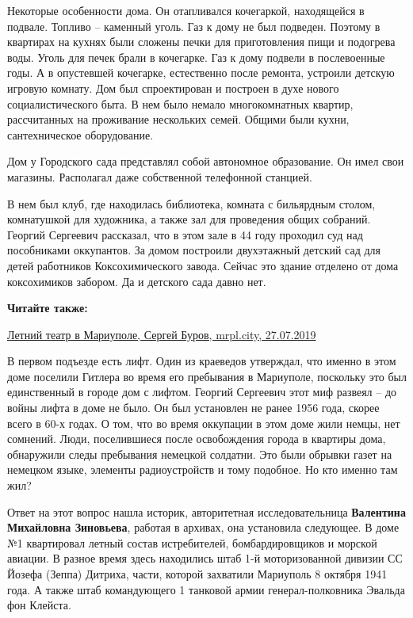 Некоторые особенности дома. Он отапливался кочегаркой, находящейся в подвале.
Топливо – каменный уголь. Газ к дому не был подведен. Поэтому в квартирах на
кухнях были сложены печки для приготовления пищи и подогрева воды. Уголь для
печек брали в кочегарке. Газ к дому подвели в послевоенные годы. А в опустевшей
кочегарке, естественно после ремонта, устроили детскую игровую комнату. Дом был
спроектирован и построен в духе нового социалистического быта. В нем было
немало многокомнатных квартир, рассчитанных на проживание нескольких семей.
Общими были кухни, сантехническое оборудование.

Дом у Городского сада представлял собой автономное образование. Он имел свои
магазины. Располагал даже собственной телефонной станцией.

В нем был клуб, где находилась библиотека, комната с бильярдным столом,
комнатушкой для художника, а также зал для проведения общих собраний. Георгий
Сергеевич рассказал, что в этом зале в 44 году проходил суд над пособниками
оккупантов. За домом построили двухэтажный детский сад для детей работников
Коксохимического завода. Сейчас это здание отделено от дома коксохимиков
забором. Да и детского сада давно нет.

\textbf{Читайте также:} 

\href{https://archive.org/details/27_07_2019.sergij_burov.mrpl_city.letnii_teatr_v_mariupole}{%
Летний театр в Мариуполе, Сергей Буров, mrpl.city, 27.07.2019}

В первом подъезде есть лифт. Один из краеведов утверждал, что именно в этом
доме поселили Гитлера во время его пребывания в Мариуполе, поскольку это был
единственный в городе дом с лифтом. Георгий Сергеевич этот миф развеял – до
войны лифта в доме не было. Он был установлен не ранее 1956 года, скорее всего
в 60-х годах. О том, что во время оккупации в этом доме жили немцы, нет
сомнений. Люди, поселившиеся после освобождения города в квартиры дома,
обнаружили следы пребывания немецкой солдатни. Это были обрывки газет на
немецком языке, элементы радиоустройств и тому подобное. Но кто именно там жил?

Ответ на этот вопрос нашла историк, авторитетная исследовательница \textbf{Валентина
Михайловна Зиновьева}, работая в архивах, она установила следующее. В доме №1
квартировал летный состав истребителей, бомбардировщиков и морской авиации. В
разное время здесь находились штаб 1-й моторизованной дивизии СС Йозефа (Зеппа)
Дитриха, части, которой захватили Мариуполь 8 октября 1941 года. А также штаб
командующего 1 танковой армии генерал-полковника Эвальда фон Клейста.

